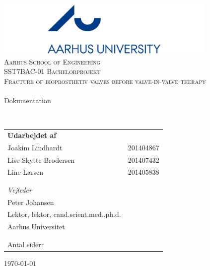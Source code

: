 \begin{titlingpage}
\begin{center}

~ \\[2.0cm]

\includegraphics[width=0.8\textwidth]{Figure/Ase} ~\\[0.5cm]

\textsc{\LARGE Aarhus School of Engineering}\\[0.5cm]

\textsc{\Large SST7BAC-01 Bachelorprojekt} ~\\[1.0cm]

\textsc{\Large Fracture of bioprosthetiv valves before valve-in-valve therapy}\\


\noindent\makebox[\linewidth]{\rule{\textwidth}{0.4pt}}\\
[0.5cm]{\Huge Dokumentation}
\noindent\makebox[\linewidth]{\rule{\textwidth}{0.4pt}}

\end{center}
~ \\[0.5cm]



\begin{table}[H]
\begin{tabular}{ll}
\textbf{Udarbejdet af} & \\
Joakim Lindhardt & 201404867\\
Lise Skytte Brodersen  & 201407432 \\
Line Larsen & 201405838 \\

\\ \\
\textit{Vejleder} & \\
Peter Johansen & \\
Lektor, lektor, cand.scient.med.,ph.d. & \\
Aarhus Universitet & \\[1ex]
\\ \\
Antal sider: \pageref{LastPage} & \\
\end{tabular}
\end{table}
		

\vfill

\begin{center}
{\large \today}

\end{center}


\end{titlingpage}
